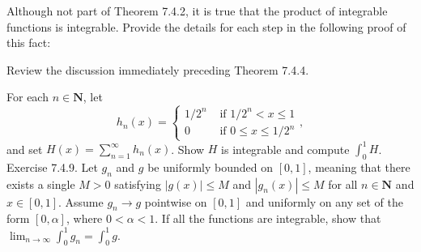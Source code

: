 \begin{exercise} Although not part of Theorem 7.4.2, it is true that the product of integrable functions is integrable. Provide the details for each step in the following proof of this fact:
\end{exercise}
\begin{solution}
    \TODO
\end{solution}

\begin{exercise} Review the discussion immediately preceding Theorem 7.4.4.
\end{exercise}
\begin{solution}
    \TODO
\end{solution}

\begin{exercise} For each $n \in \mathbf{N}$, let
$$
h_{n}(x)=\left\{\begin{array}{ll}
1 / 2^{n} & \text { if } 1 / 2^{n}<x \leq 1 \\
0 & \text { if } 0 \leq x \leq 1 / 2^{n}
\end{array},\right.
$$
and set $H(x)=\sum_{n=1}^{\infty} h_{n}(x)$. Show $H$ is integrable and compute $\int_{0}^{1} H$. Exercise 7.4.9. Let $g_{n}$ and $g$ be uniformly bounded on $[0,1]$, meaning that there exists a single $M>0$ satisfying $|g(x)| \leq M$ and $\left|g_{n}(x)\right| \leq M$ for all $n \in \mathbf{N}$ and $x \in[0,1]$. Assume $g_{n} \rightarrow g$ pointwise on $[0,1]$ and uniformly on any set of the form $[0, \alpha]$, where $0<\alpha<1$.
If all the functions are integrable, show that $\lim _{n \rightarrow \infty} \int_{0}^{1} g_{n}=\int_{0}^{1} g$.
\end{exercise}
\begin{solution}
    \TODO
\end{solution}

